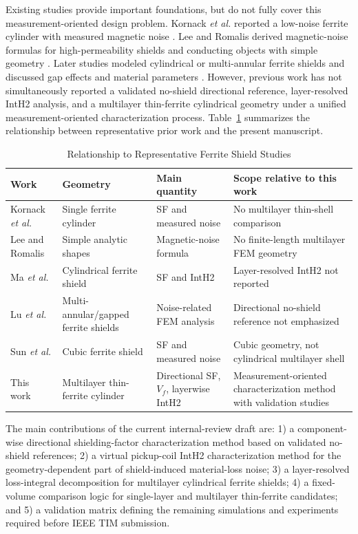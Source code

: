 ﻿\documentclass[letterpaper,journal]{IEEEtran}
\begin{document}
Existing studies provide important foundations, but do not fully cover this measurement-oriented design problem. Kornack \textit{et al.} reported a low-noise ferrite cylinder with measured magnetic noise \cite{ref12}. Lee and Romalis derived magnetic-noise formulas for high-permeability shields and conducting objects with simple geometry \cite{ref9}. Later studies modeled cylindrical or multi-annular ferrite shields and discussed gap effects and material parameters \cite{ref13,ref14,ref17}. However, previous work has not simultaneously reported a validated no-shield directional reference, layer-resolved IntH2 analysis, and a multilayer thin-ferrite cylindrical geometry under a unified measurement-oriented characterization process. Table~\ref{tab:comparison} summarizes the relationship between representative prior work and the present manuscript.

\begin{table}[!t]
\caption{Relationship to Representative Ferrite Shield Studies}
\label{tab:comparison}
\centering
\footnotesize
\setlength{\tabcolsep}{3pt}
\begin{tabular}{p{}p{}p{}p{}}
\toprule
Work & Geometry & Main quantity & Scope relative to this work \\
\midrule
Kornack \textit{et al.} \cite{ref12} & Single ferrite cylinder & SF and measured noise & No multilayer thin-shell comparison \\
Lee and Romalis \cite{ref9} & Simple analytic shapes & Magnetic-noise formula & No finite-length multilayer FEM geometry \\
Ma \textit{et al.} \cite{ref13} & Cylindrical ferrite shield & SF and IntH2 & Layer-resolved IntH2 not reported \\
Lu \textit{et al.} \cite{ref14,ref17} & Multi-annular/gapped ferrite shields & Noise-related FEM analysis & Directional no-shield reference not emphasized \\
Sun \textit{et al.} \cite{ref16} & Cubic ferrite shield & SF and measured noise & Cubic geometry, not cylindrical multilayer shell \\
This work & Multilayer thin-ferrite cylinder & Directional SF, $V_f$, layerwise IntH2 & Measurement-oriented characterization method with validation studies \\
\bottomrule
\end{tabular}
\end{table}

The main contributions of the current internal-review draft are: 1) a component-wise directional shielding-factor characterization method based on validated no-shield references; 2) a virtual pickup-coil IntH2 characterization method for the geometry-dependent part of shield-induced material-loss noise; 3) a layer-resolved loss-integral decomposition for multilayer cylindrical ferrite shields; 4) a fixed-volume comparison logic for single-layer and multilayer thin-ferrite candidates; and 5) a validation matrix defining the remaining simulations and experiments required before IEEE TIM submission.
\end{document}
